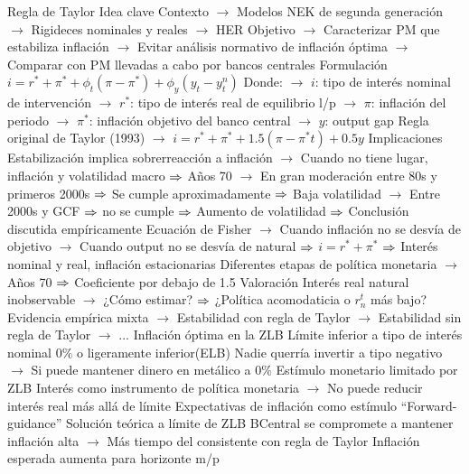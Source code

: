 \documentclass{nuevotema}
\begin{document}
\begin{esquemal}
			\3 Regla de Taylor
				\4 Idea clave
				\4[] Contexto
				\4[] $\to$ Modelos NEK de segunda generación
				\4[] $\to$ Rigideces nominales y reales
				\4[] $\to$ HER
				\4[] Objetivo
				\4[] $\to$ Caracterizar PM que estabiliza inflación
				\4[] $\to$ Evitar análisis normativo de inflación óptima
				\4[] $\to$ Comparar con PM llevadas a cabo por bancos centrales
				\4 Formulación
				\4[] $i = r^* + \pi^* + \phi_t (\pi - \pi^*) + \phi_y (y_t - y_t^n)$
				\4[] Donde:
				\4[] $\to$ $i$: tipo de interés nominal de intervención
				\4[] $\to$ $r^*$: tipo de interés real de equilibrio l/p
				\4[] $\to$ $\pi$: inflación del periodo
				\4[] $\to$ $\pi^*$: inflación objetivo del banco central
				\4[] $\to$ $y$: output gap
				\4[] Regla original de Taylor (1993)
				\4[] $\to$ $i = r^* + \pi^* + 1.5(\pi - \pi^*t) + 0.5 y$
				\4 Implicaciones
				\4[] Estabilización implica sobrerreacción a inflación
				\4[] $\to$ Cuando no tiene lugar, inflación y volatilidad macro
				\4[] $\Rightarrow$ Años 70
				\4[] $\to$ En gran moderación entre 80s y primeros 2000s
				\4[] $\Rightarrow$ Se cumple aproximadamente
				\4[] $\Rightarrow$ Baja volatilidad
				\4[] $\to$ Entre 2000s y GCF
				\4[] $\Rightarrow$ no se cumple
				\4[] $\Rightarrow$ Aumento de volatilidad
				\4[] $\Rightarrow$ Conclusión discutida empíricamente
				\4[] Ecuación de Fisher
				\4[] $\to$ Cuando inflación no se desvía de objetivo
				\4[] $\to$ Cuando output no se desvía de natural
				\4[] $\Rightarrow$ $i=r^* + \pi^*$
				\4[] $\Rightarrow$ Interés nominal y real, inflación estacionarias
				\4[] Diferentes etapas de política monetaria
				\4[] $\to$ Años 70
				\4[] $\Rightarrow$ Coeficiente por debajo de 1.5
				\4 Valoración
				\4[] Interés real natural inobservable
				\4[] $\to$ ¿Cómo estimar?
				\4[] $\Rightarrow$ ¿Política acomodaticia o $r_n^t$ más bajo?
				\4[] Evidencia empírica mixta
				\4[] $\to$ Estabilidad con regla de Taylor
				\4[] $\to$ Estabilidad sin regla de Taylor
				\4[] $\to$ ...
			\3 Inflación óptima en la ZLB
				\4 Límite inferior a tipo de interés nominal
				\4[] $0\%$ o ligeramente inferior(ELB)
				\4[] Nadie querría invertir a tipo negativo
				\4[] $\to$ Si puede mantener dinero en metálico a $0\%$
				\4 Estímulo monetario limitado por ZLB
				\4[] Interés como instrumento de política monetaria
				\4[] $\to$ No puede reducir interés real más allá de límite
				\4 Expectativas de inflación como estímulo
				\4[] ``Forward-guidance''
				\4[] Solución teórica a límite de ZLB
				\4[] BCentral se compromete a mantener inflación alta
				\4[] $\to$ Más tiempo del consistente con regla de Taylor
				\4[] Inflación esperada aumenta para horizonte m/p

\end{esquemal}
\end{document}
